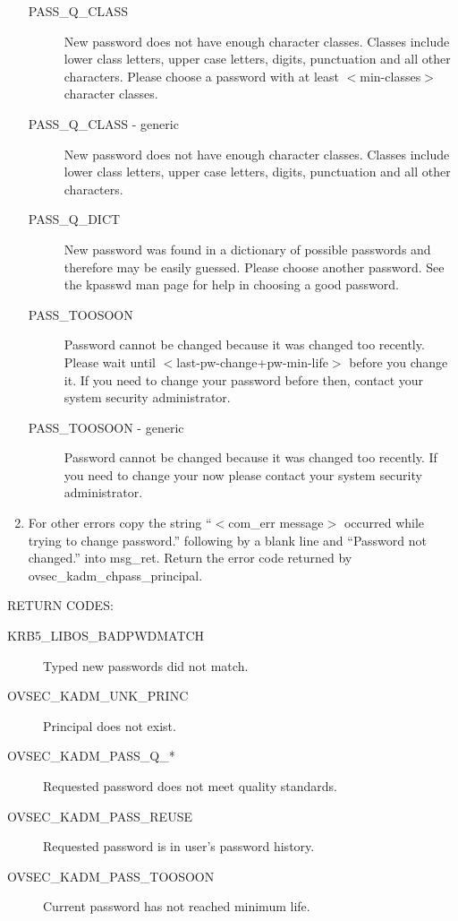 \begin{enumerate}
\begin{description}
\item[PASS_Q_CLASS]
New password does not have enough character classes. Classes include
lower class letters, upper case letters, digits, punctuation and all
other characters.  Please choose a password with at least
$<$min-classes$>$ character classes.

\item[PASS_Q_CLASS - generic]
New password does not have enough character classes. Classes include
lower class letters, upper case letters, digits, punctuation and all
other characters. 

\item[PASS_Q_DICT] 
New password was found in a dictionary of possible passwords and
therefore may be easily guessed.  Please choose another password. See
the kpasswd man page for help in choosing a good password.

\item[PASS_TOOSOON]
Password cannot be changed because it was changed too recently. Please
wait until $<$last-pw-change+pw-min-life$>$ before you change it. If you
need to change your password before then, contact your system
security administrator.

\item[PASS_TOOSOON - generic]
Password cannot be changed because it was changed too recently. If you
need to change your now please contact your system security
administrator.
\end{description}

\item For other errors copy the string ``$<$com_err message$>$ occurred while trying to change password.'' following by a blank line and ``Password not changed.'' into msg_ret. Return the error code returned by ovsec_kadm_chpass_principal.
\end{enumerate}


RETURN CODES:

\begin{description}
\item[KRB5_LIBOS_BADPWDMATCH] Typed new passwords did not match.
\item[OVSEC_KADM_UNK_PRINC] Principal does not exist.
\item[OVSEC_KADM_PASS_Q_*] Requested password does not meet quality
standards. 
\item[OVSEC_KADM_PASS_REUSE] Requested password is in user's
password history. 
\item[OVSEC_KADM_PASS_TOOSOON] Current password has not reached minimum
life. 
\end{description}


